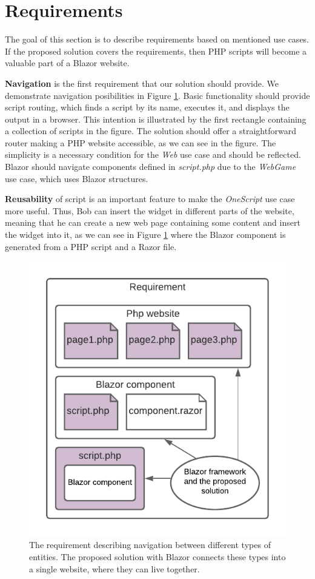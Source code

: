 \section{Requirements}

The goal of this section is to describe requirements based on mentioned use cases.
If the proposed solution covers the requirements, then PHP scripts will become a valuable part of a Blazor website.
\par
\textbf{Navigation} is the first requirement that our solution should provide.
We demonstrate navigation posibilities in Figure \ref{img10:scripts}.
Basic functionality should provide script routing, which finds a script by its name, executes it, and displays the output in a browser.
This intention is illustrated by the first rectangle containing a collection of scripts in the figure.
The solution should offer a straightforward router making a PHP website accessible, as we can see in the figure.
The simplicity is a necessary condition for the \textit{Web} use case and should be reflected.
Blazor should navigate components defined in \textit{script.php} due to the \textit{WebGame} use case, which uses Blazor structures.
\par
\textbf{Reusability} of script is an important feature to make the \textit{OneScript} use case more useful.
Thus, Bob can insert the widget in different parts of the website, meaning that he can create a new web page containing some content and insert the widget into it, as we can see in Figure \ref{img10:scripts} where the Blazor component is generated from a PHP script and a Razor file.
\par
\begin{figure}[t]\centering
\includegraphics{./img/Requirement}
\caption{The requirement describing navigation between different types of entities. 
The proposed solution with Blazor connects these types into a single website, where they can live together.
}
\label{img10:scripts}
\end{figure} 
